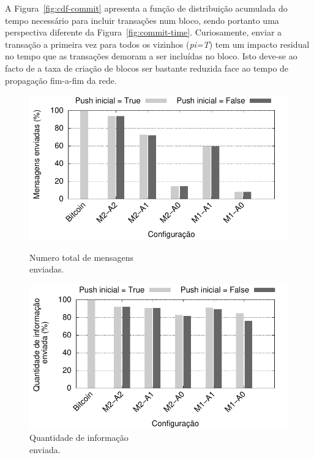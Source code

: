 A Figura~\ref{fig:cdf-commit} apresenta a função de distribuição acumulada do tempo necessário para incluir transações num bloco, sendo portanto uma perspectiva diferente da Figura~\ref{fig:commit-time}.
Curiosamente, enviar a transação a primeira vez para todos os vizinhos (\emph{pi=T}) tem um impacto residual no tempo que as transações demoram a ser incluídas no bloco.
Isto deve-se ao facto de a taxa de criação de blocos ser bastante reduzida face ao tempo de propagação fim-a-fim da rede.

\begin{figure}
\centering
\begin{minipage}{.5\textwidth}
  	\centering
  	\includegraphics[width=1\textwidth]{plots/msg-sent.pdf}
	\caption{Numero total de mensagens \\\hspace{\textwidth} enviadas.}
	\label{fig:msg-sent}
\end{minipage}%
\begin{minipage}{.5\textwidth}
  	\centering
  	\includegraphics[width=1\textwidth]{plots/mb-sent.pdf}
	\caption{Quantidade de informação \\\hspace{\textwidth} enviada.}
	\label{fig:mb-sent}
\end{minipage}
\vspace{-0.5cm}
\end{figure}

